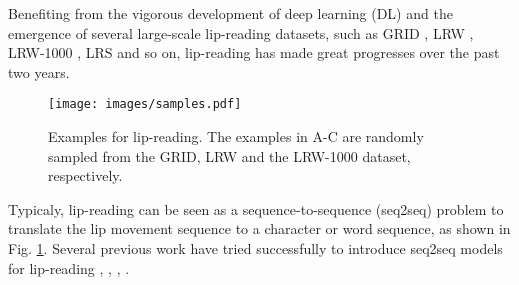 \documentclass[a4paper, 10pt, conference]{ieeeconf}      %
\begin{document}
Benefiting from the vigorous development of deep learning (DL) and the emergence of several large-scale lip-reading datasets, such as GRID \cite{cooke2006}, LRW \cite{B2017}, LRW-1000 \cite{Yang2019}, LRS \cite{Chung} and so on, lip-reading has made great progresses over the past two years.
 \begin{figure}
	\setlength{\abovecaptionskip}{0.05cm}
	\setlength{\belowcaptionskip}{-0.4cm} 
	\centering
	\texttt{[image: images/samples.pdf]}
	\caption{Examples for lip-reading. The examples in A-C are randomly sampled from the GRID, LRW and the LRW-1000 dataset, respectively.}
	\label{samples}
	\vspace{-0.5em}
\end{figure}
Typicaly, lip-reading can be seen as a sequence-to-sequence (seq2seq) problem to translate the lip movement sequence to a character or word sequence, as shown in Fig. \ref{samples}. Several previous work have tried successfully to introduce seq2seq models for lip-reading \cite{Afouras2018}, \cite{Chung}, \cite{Afouras2017}, \cite{Chung2017}. %
\end{document}
